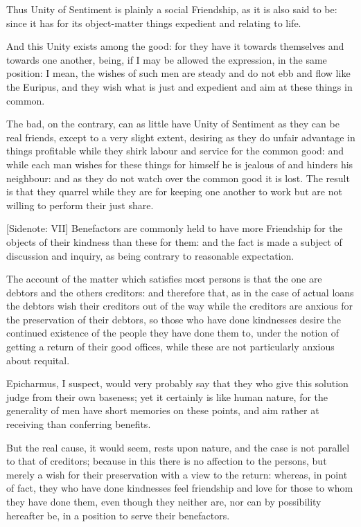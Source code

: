 Thus Unity of Sentiment is plainly a social Friendship, as it is also
said to be: since it has for its object-matter things expedient and
relating to life.

And this Unity exists among the good: for they have it towards
themselves and towards one another, being, if I may be allowed the
expression, in the same position: I mean, the wishes of such men are
steady and do not ebb and flow like the Euripus, and they wish what is
just and expedient and aim at these things in common.

The bad, on the contrary, can as little have Unity of Sentiment as they
can be real friends, except to a very slight extent, desiring as they
do unfair advantage in things profitable while they shirk labour and
service for the common good: and while each man wishes for these things
for himself he is jealous of and hinders his neighbour: and as they
do not watch over the common good it is lost. The result is that they
quarrel while they are for keeping one another to work but are not
willing to perform their just share.

[Sidenote: VII] Benefactors are commonly held to have more Friendship
for the objects of their kindness than these for them: and the fact
is made a subject of discussion and inquiry, as being contrary to
reasonable expectation.

The account of the matter which satisfies most persons is that the one
are debtors and the others creditors: and therefore that, as in the case
of actual loans the debtors wish their creditors out of the way while
the creditors are anxious for the preservation of their debtors, so
those who have done kindnesses desire the continued existence of the
people they have done them to, under the notion of getting a return
of their good offices, while these are not particularly anxious about
requital.

Epicharmus, I suspect, would very probably say that they who give this
solution judge from their own baseness; yet it certainly is like human
nature, for the generality of men have short memories on these points,
and aim rather at receiving than conferring benefits.

But the real cause, it would seem, rests upon nature, and the case is
not parallel to that of creditors; because in this there is no affection
to the persons, but merely a wish for their preservation with a view to
the return: whereas, in point of fact, they who have done kindnesses
feel friendship and love for those to whom they have done them, even
though they neither are, nor can by possibility hereafter be, in a
position to serve their benefactors.

